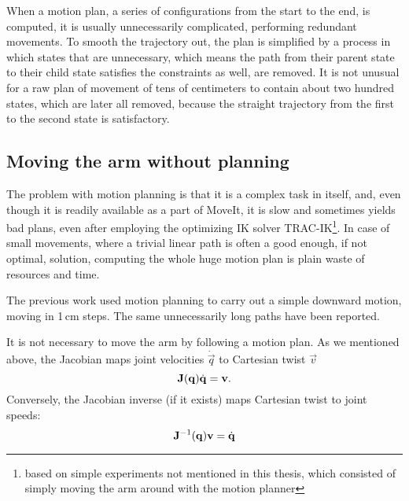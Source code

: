 \documentclass[buriama8_dp.tex]{subfiles}
\begin{document}


When a motion plan, a series of configurations from the start to the end, is computed, it is usually unnecessarily complicated, performing redundant movements. To smooth the trajectory out, the plan is simplified by a process in which states that are unnecessary, which means the path from their parent state to their child state satisfies the constraints as well, are removed. It is not unusual for a raw plan of movement of tens of centimeters to contain about two hundred states, which are later all removed, because the straight trajectory from the first to the second state is satisfactory.

\subsection{Moving the arm without planning}
\label{subsec:no_plan}

The problem with motion planning is that it is a complex task in itself, and, even though it is readily available as a part of MoveIt, it is slow and sometimes yields bad plans, even after employing the optimizing IK solver TRAC-IK\footnote{based on simple experiments not mentioned in this thesis, which consisted of simply moving the arm around with the motion planner}. In case of small movements, where a trivial linear path is often a good enough, if not optimal, solution, computing the whole huge motion plan is plain waste of resources and time.

The previous work \cite{vojta} used motion planning to carry out a simple downward motion, moving in 1\,cm steps. The same unnecessarily long paths have been reported.

It is not necessary to move the arm by following a motion plan. As we mentioned above, the Jacobian maps joint velocities \(\dot{\vec{q}}\) to Cartesian twist \(\vec{v}\)
\[
\mathbf{J}(\mathbf{q}) \dot{\mathbf{q}} = \mathbf{v}.
\]
Conversely, the Jacobian inverse (if it exists) maps Cartesian twist to joint speeds:
\[
\mathbf{J}^{-1}(\mathbf{q}) \mathbf{v} = \dot{\mathbf{q}}
\]
\end{document}
